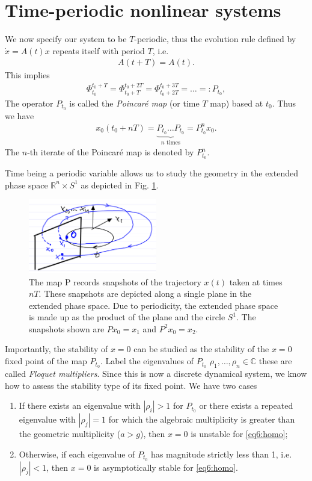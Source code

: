 \section{Time-periodic nonlinear systems}
We now specify our system to be $T$-periodic, thus the evolution rule defined by $\dot{x}=A(t)x$ repeats itself with period $T$, i.e.
\begin{align}
	A(t+T) = A(t).
\end{align}
This implies
\begin{align}
	\Phi_{t_0}^{t_0 +T} = 	\Phi_{t_0+T}^{t_0 +2T} =\Phi_{t_0+2T}^{t_0 +3T} =\ldots =: P_{t_0},  
\end{align}
The operator $P_{t_0}$ is called the \emph{Poincaré map} (or time $T$ map) based at $t_0$. Thus we have
\begin{align}
x_0(t_0+nT) = \underbrace{P_{t_0} \ldots P_{t_0}}_{n  \textrm{ times} } = P_{t_0}^{n}x_0.
\end{align}
The $n$-th iterate of the Poincaré map is denoted by $P_{t_0}^{n}$.

Time being a periodic variable allows us to study the geometry in the extended phase space $\mathbb{R}^{n}\times S^{1}$ as depicted in Fig. \ref{fig:poinc_geom}.
\begin{figure}[h!]
	\centering
	\includegraphics[width=0.5\textwidth]{figures/ch5/1poinc_geom.png}
	\caption{The map P records snapshots of the trajectory $x(t)$ taken at times $nT$. These snapshots are depicted along a single plane in the extended phase space. Due to periodicity, the extended phase space is made up as the product of the plane and the circle $S^1$. The snapshots shown are $Px_0 = x_1$ and $P^2 x_0 = x_2$.}
	\label{fig:poinc_geom}
\end{figure}
Importantly, the stability of $x=0$ can be studied as the stability of the $x=0$ fixed point of the map $P_{t_0}$. Label the eigenvalues of $P_{t_0}$ $\rho_1,\ldots,\rho_n\in\mathbb{C}$ these are called \emph{Floquet multipliers}. Since this is now a discrete dynamical system, we know how to assess the stability type of its fixed point. We have two cases
\begin{enumerate}
	\item If there exists an eigenvalue with $|\rho_i|>1$ for $P_{t_0}$ or there exists a repeated eigenvalue with $|\rho_j|=1$ for which the algebraic multiplicity is greater than the geometric multiplicity ($a>g$), then $x=0$ is unstable for \eqref{eq6:homo};
	\item Otherwise, if each eigenvalue of $P_{t_0}$ has magnitude strictly less than 1, i.e. $|\rho_j|<1$, then $x=0$ is asymptotically stable for \eqref{eq6:homo}.
\end{enumerate}

